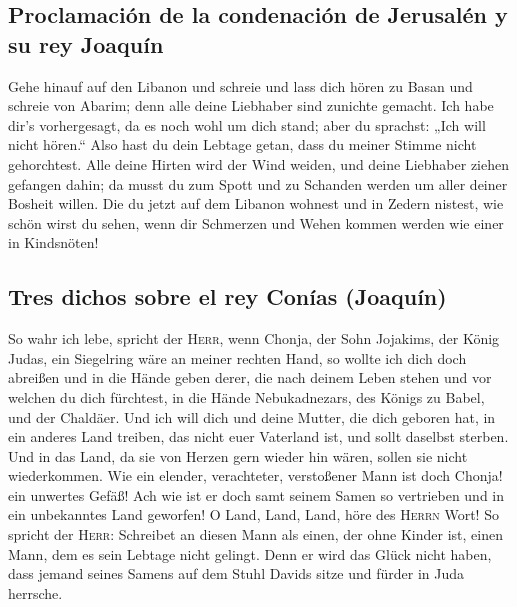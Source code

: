 \hypertarget{proclamaciuxf3n-de-la-condenaciuxf3n-de-jerusaluxe9n-y-su-rey-joaquuxedn}{%
\subsection{Proclamación de la condenación de Jerusalén y su rey
Joaquín}\label{proclamaciuxf3n-de-la-condenaciuxf3n-de-jerusaluxe9n-y-su-rey-joaquuxedn}}

 Gehe hinauf auf den Libanon und schreie und lass dich
hören zu Basan und schreie von Abarim; denn alle deine Liebhaber sind
zunichte gemacht.  Ich habe dir's vorhergesagt, da es
noch wohl um dich stand; aber du sprachst: „Ich will nicht hören.`` Also
hast du dein Lebtage getan, dass du meiner Stimme nicht gehorchtest.
 Alle deine Hirten wird der Wind weiden, und deine
Liebhaber ziehen gefangen dahin; da musst du zum Spott und zu Schanden
werden um aller deiner Bosheit willen.  Die du jetzt auf
dem Libanon wohnest und in Zedern nistest, wie schön wirst du sehen,
wenn dir Schmerzen und Wehen kommen werden wie einer in Kindsnöten!

\hypertarget{tres-dichos-sobre-el-rey-conuxedas-joaquuxedn}{%
\subsection{Tres dichos sobre el rey Conías
(Joaquín)}\label{tres-dichos-sobre-el-rey-conuxedas-joaquuxedn}}

 So wahr ich lebe, spricht der \textsc{Herr}, wenn
Chonja, der Sohn Jojakims, der König Judas, ein Siegelring wäre an
meiner rechten Hand, so wollte ich dich doch abreißen 
und in die Hände geben derer, die nach deinem Leben stehen und vor
welchen du dich fürchtest, in die Hände Nebukadnezars, des Königs zu
Babel, und der Chaldäer.  Und ich will dich und deine
Mutter, die dich geboren hat, in ein anderes Land treiben, das nicht
euer Vaterland ist, und sollt daselbst sterben.  Und in
das Land, da sie von Herzen gern wieder hin wären, sollen sie nicht
wiederkommen.  Wie ein elender, verachteter, verstoßener
Mann ist doch Chonja! ein unwertes Gefäß! Ach wie ist er doch samt
seinem Samen so vertrieben und in ein unbekanntes Land geworfen!
 O Land, Land, Land, höre des \textsc{Herrn} Wort!
 So spricht der \textsc{Herr}: Schreibet an diesen Mann
als einen, der ohne Kinder ist, einen Mann, dem es sein Lebtage nicht
gelingt. Denn er wird das Glück nicht haben, dass jemand seines Samens
auf dem Stuhl Davids sitze und fürder in Juda herrsche.

